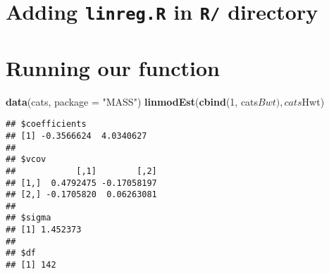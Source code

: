 \documentclass[]{book}
\newenvironment{Shaded}{\begin{snugshade}}{\end{snugshade}}
\newcommand{\KeywordTok}[1]{\textcolor[rgb]{0.13,0.29,0.53}{\textbf{{#1}}}}
\newcommand{\DataTypeTok}[1]{\textcolor[rgb]{0.13,0.29,0.53}{{#1}}}
\newcommand{\DecValTok}[1]{\textcolor[rgb]{0.00,0.00,0.81}{{#1}}}
\newcommand{\StringTok}[1]{\textcolor[rgb]{0.31,0.60,0.02}{{#1}}}
\newcommand{\NormalTok}[1]{{#1}}
\theoremstyle{definition}
\theoremstyle{definition}
\theoremstyle{definition}
\theoremstyle{remark}
\begin{document}
\section{\texorpdfstring{Adding \texttt{linreg.R} in \texttt{R/}
directory}{Adding linreg.R in R/ directory}}\label{adding-linreg.r-in-r-directory}

\begin{Shaded}
\end{Shaded}

\section{Running our function}\label{running-our-function}

\begin{Shaded}
\begin{Highlighting}[]
\KeywordTok{data}\NormalTok{(cats, }\DataTypeTok{package =} \StringTok{"MASS"}\NormalTok{)}
\KeywordTok{linmodEst}\NormalTok{(}\KeywordTok{cbind}\NormalTok{(}\DecValTok{1}\NormalTok{, cats$Bwt), cats$Hwt)}
\end{Highlighting}
\end{Shaded}

\begin{verbatim}
## $coefficients
## [1] -0.3566624  4.0340627
## 
## $vcov
##            [,1]        [,2]
## [1,]  0.4792475 -0.17058197
## [2,] -0.1705820  0.06263081
## 
## $sigma
## [1] 1.452373
## 
## $df
## [1] 142
\end{verbatim}
\end{document}

